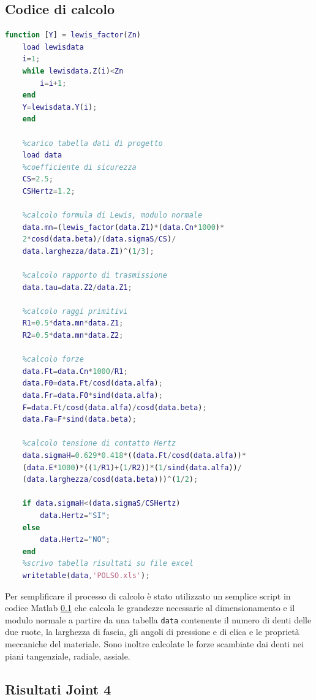 \documentclass[%
corpo=11pt,
twoside,
 stile=classica,
oldstyle,
greek,%
]{toptesi}
\begin{document}
	\subsection{Codice di calcolo}
	\label{matlabcode}
	\begin{lstlisting}[language=Matlab]
	function [Y] = lewis_factor(Zn)
	load lewisdata
	i=1;
	while lewisdata.Z(i)<Zn
		i=i+1;
	end
	Y=lewisdata.Y(i);
	end
	
	%carico tabella dati di progetto 
	load data
	%coefficiente di sicurezza
	CS=2.5;
	CSHertz=1.2;
	
	%calcolo formula di Lewis, modulo normale
	data.mn=(lewis_factor(data.Z1)*(data.Cn*1000)*
	2*cosd(data.beta)/(data.sigmaS/CS)/
	data.larghezza/data.Z1)^(1/3);
	
	%calcolo rapporto di trasmissione
	data.tau=data.Z2/data.Z1;
	
	%calcolo raggi primitivi 
	R1=0.5*data.mn*data.Z1;
	R2=0.5*data.mn*data.Z2;
	
	%calcolo forze
	data.Ft=data.Cn*1000/R1;
	data.F0=data.Ft/cosd(data.alfa);
	data.Fr=data.F0*sind(data.alfa);
	F=data.Ft/cosd(data.alfa)/cosd(data.beta);
	data.Fa=F*sind(data.beta);
	
	%calcolo tensione di contatto Hertz
	data.sigmaH=0.629*0.418*((data.Ft/cosd(data.alfa))*
	(data.E*1000)*((1/R1)+(1/R2))*(1/sind(data.alfa))/
	(data.larghezza/cosd(data.beta)))^(1/2);
	
	if data.sigmaH<(data.sigmaS/CSHertz)
		data.Hertz="SI";
	else
		data.Hertz="NO";
	end
	%scrivo tabella risultati su file excel
	writetable(data,'POLSO.xls');
	\end{lstlisting}
	
		Per semplificare il processo di calcolo è stato utilizzato un semplice script in codice Matlab \ref{matlabcode} che calcola le grandezze necessarie al dimensionamento e il modulo normale a partire da una tabella \verb|data| contenente il numero di denti delle due ruote, la larghezza di fascia, gli angoli di pressione e di elica e le proprietà meccaniche del materiale. Sono inoltre calcolate le forze scambiate dai denti nei piani tangenziale, radiale, assiale.
		
		
		
		\subsection{Risultati Joint 4}
		
\end{document}
